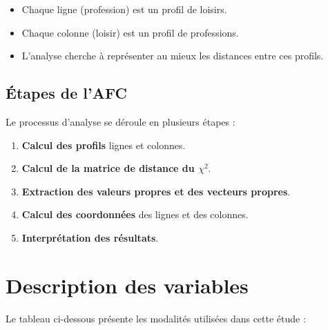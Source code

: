 \documentclass[12pt,a4paper]{book}
\begin{document}
	\begin{itemize}
		\item Chaque ligne (profession) est un profil de loisirs.
		\item Chaque colonne (loisir) est un profil de professions.
		\item L'analyse cherche à représenter au mieux les distances entre ces profils.
	\end{itemize}
	
	\vspace{0.5cm}
	
	\begin{center}
	\end{center}
	
	\subsection{Étapes de l'AFC}
	
	Le processus d'analyse se déroule en plusieurs étapes :
	
	\begin{enumerate}
		\item \textbf{Calcul des profils} lignes et colonnes.
		\item \textbf{Calcul de la matrice de distance du $\chi^2$}.
		\item \textbf{Extraction des valeurs propres et des vecteurs propres}.
		\item \textbf{Calcul des coordonnées} des lignes et des colonnes.
		\item \textbf{Interprétation des résultats}.
	\end{enumerate}
	
	\section{Description des variables}
	
	Le tableau ci-dessous présente les modalités utilisées dans cette étude :
	
\end{document}
